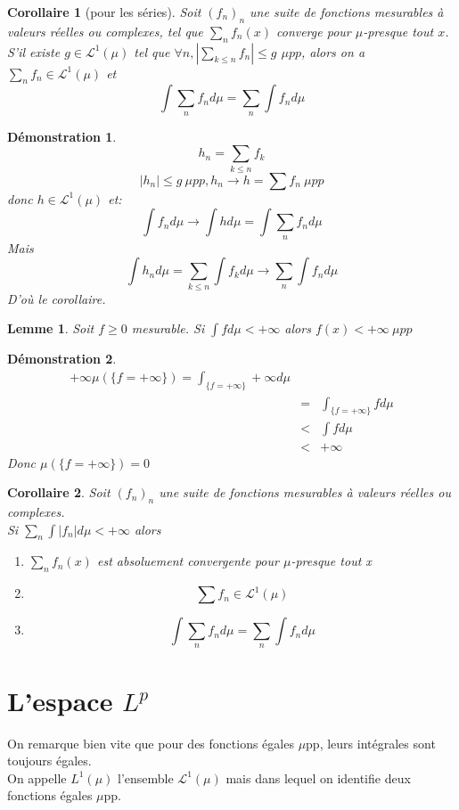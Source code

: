 \documentclass{article}
\theoremstyle{mes_theoremes}
\newtheorem{coro}{Corollaire}[section]
\newtheorem*{dem}{Démonstration}
\newtheorem*{lemme}{Lemme}
\begin{document}
\begin{coro}[pour les séries]
Soit $(f_n)_n$ une suite de fonctions mesurables à valeurs réelles ou complexes, tel que $\sum_n f_n(x)$ converge pour $\mu$-presque tout $x$. \\
S'il existe $g\in \mathcal{L}^1(\mu)$ tel que $\forall n, |\sum_{k\leq n} f_n| \leq g$ $\mu pp$, alors on a $\sum_n f_n \in \mathcal{L}^1(\mu)$ et 
\[\int \sum_n f_n d\mu = \sum_n \int f_n d\mu\]
\end{coro}

\begin{dem}
\[h_n = \sum_{k\leq n} f_k\]
\[|h_n| \leq g\ \mu pp, h_n \rightarrow h=\sum f_n\ \mu pp\]
donc $h\in \mathcal{L}^1(\mu)$ et: \[\int f_n d\mu \rightarrow \int h d\mu = \int \sum_n f_n d\mu\]
Mais \[\int h_n d\mu = \sum_{k\leq n} \int f_k d\mu \rightarrow \sum_n \int f_n d\mu\]
D'où le corollaire.
\end{dem}

\begin{lemme}
Soit $f\geq 0$ mesurable. Si $\int f d\mu < +\infty$ alors $f(x)<+\infty\ \mu pp$
\end{lemme}

\begin{dem}
\begin{eqnarray*}
+\infty \mu(\{f=+\infty\})=\int_{\{f=+\infty\}} +\infty d\mu \\ &=& \int_{\{f=+\infty\}} f d\mu \\ &<& \int f d\mu \\ &<& +\infty
\end{eqnarray*}
Donc $\mu(\{f=+\infty\}) = 0$
\end{dem}

\begin{coro}
Soit $(f_n)_n$ une suite de fonctions mesurables à valeurs réelles ou complexes. \\
Si $\sum_n \int |f_n| d\mu < +\infty$ alors
\begin{enumerate}
\item $\sum_n f_n(x)$ est absoluement convergente pour $\mu$-presque tout x
\item \[\sum f_n \in \mathcal{L}^1(\mu)\]
\item \[\int \sum_n f_n d\mu = \sum_n \int f_n d\mu\]
\end{enumerate}
\end{coro}

\section{L'espace $L^p$}
On remarque bien vite que pour des fonctions égales $\mu$pp, leurs intégrales sont toujours égales.\\
On appelle $L^1(\mu)$ l'ensemble $\mathcal{L}^1(\mu)$ mais dans lequel on identifie deux fonctions égales $\mu$pp.
\end{document}
